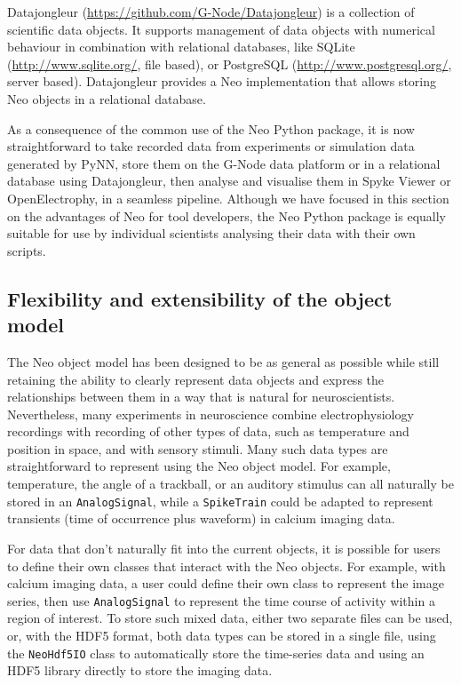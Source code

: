 \documentclass{frontiers}
\begin{document}
Datajongleur (\url{https://github.com/G-Node/Datajongleur}) is a collection of
scientific data objects. It supports management of data objects with numerical
behaviour in combination with relational databases, like SQLite
(\url{http://www.sqlite.org/}, file based), or PostgreSQL
(\url{http://www.postgresql.org/}, server based). Datajongleur provides
a Neo implementation that allows storing Neo objects in a relational database.


As a consequence of the common use of the Neo Python package, it is now straightforward to take recorded data from experiments or simulation data generated by PyNN, store them on the G-Node data platform or in a relational database using Datajongleur, then analyse and visualise them in Spyke Viewer or OpenElectrophy, in a seamless pipeline.
Although we have focused in this section on the advantages of Neo for tool developers, the Neo Python package is equally suitable for use by individual scientists analysing their data with their own scripts.


\subsection{Flexibility and extensibility of the object model}

The Neo object model has been designed to be as general as possible while still retaining the ability to clearly represent data objects and express the relationships between them in a way that is natural for neuroscientists. Nevertheless, many experiments in neuroscience combine electrophysiology recordings with recording of other types of data, such as temperature and position in space, and with sensory stimuli. Many such data types are straightforward to represent using the Neo object model. For example, temperature, the angle of a trackball, or an auditory stimulus can all naturally be stored in an  \lstinline`AnalogSignal`, while a \lstinline`SpikeTrain` could be adapted to represent transients (time of occurrence plus waveform) in calcium imaging data.

For data that don't naturally fit into the current objects, it is possible for users to define their own classes that interact with the Neo objects. For example, with calcium imaging data, a user could define their own class to represent the image series, then use  \lstinline`AnalogSignal` to represent the time course of activity within a region of interest. To store such mixed data, either two separate files can be used, or, with the HDF5 format, both data types can be stored in a single file, using the \lstinline`NeoHdf5IO` class to automatically store the time-series data and using an HDF5 library directly to store the imaging data.
\end{document}
